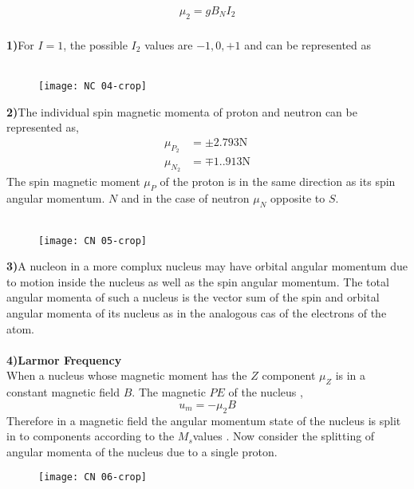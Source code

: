 \begin{enumerate}
\begin{enumerate}
\begin{align*}
\mu_{2}=g B_{N} I_{2}\\
\end{align*}
\end{enumerate}
\begin{note}
	\textbf{1)}\quad For $I=1$, the possible $I_2$ values are $-1,0,+1$ and can be represented as \\\\
	\begin{figure}[H]
		\centering
		\texttt{[image: NC 04-crop]}
		\caption{}
		\label{}
	\end{figure}
	\textbf{2)}\quad The individual spin magnetic momenta of proton and neutron can be represented as,\\
 \begin{align*}
 \mu_{P_{2}}&=\pm 2.793 \mathrm{N}\\
  \mu_{N_{2}}&=\mp 1..913 \mathrm{N}
 \end{align*}
 The spin magnetic moment $\mu_P$ of the proton is in the same direction as its spin angular momentum. $N$ and in the case of neutron $\mu_{N}$ opposite to $S$.\\\\
 \begin{figure}[H]
 	\centering
 	\texttt{[image: CN 05-crop]}
 	\caption{}
 	\label{}
 \end{figure}
 \textbf{3)}\quad A nucleon in a more complux nucleus may have orbital angular momentum  due to motion inside the nucleus as well as the spin angular momentum. The total angular momenta of such a nucleus is the vector sum of the spin and orbital angular momenta of its nucleus as in the analogous cas of the electrons of the atom.\\\\
 	\textbf{4)}\quad \textbf{Larmor Frequency}\\
 	When a nucleus whose magnetic moment has the $Z$ component $\mu_{Z}$ is in a constant magnetic field $B$. The magnetic $PE$ of the nucleus ,\\
 	$$u_{m}=-\mu_{2} B$$
 	Therefore in a magnetic field the angular momentum state of the nucleus is split in to components according to the $M_s$values . Now consider the splitting of angular momenta of the nucleus due to a single proton.\\
 	\begin{figure}[H]
 		\centering
 		\texttt{[image: CN 06-crop]}
 		\caption{}
 		\label{}
 	\end{figure}

\end{note}
\end{enumerate}
